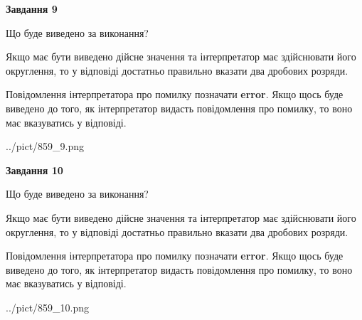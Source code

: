 \documentclass[12pt, ukrainian]{article}
\begin{document}
{\begin {Large}
{\begin {center}\textbf{Завдання 9}\end {center}}\par
Що буде виведено за виконання? \par

Якщо має бути виведено дійсне значення та інтерпретатор має здійснювати його округлення, 
то у відповіді достатньо правильно вказати два дробових розряди.

Повідомлення інтерпретатора про помилку позначати \textbf{error}.
Якщо щось буде виведено до того, як інтерпретатор видасть повідомлення про помилку, 
то воно має вказуватись у відповіді. \par

\begin{center}
	{../pict/859_9.png}
\end{center}
\newpage

{\begin {center}\textbf{Завдання 10}\end {center}}\par
Що буде виведено за виконання? \par

Якщо має бути виведено дійсне значення та інтерпретатор має здійснювати його округлення, 
то у відповіді достатньо правильно вказати два дробових розряди.

Повідомлення інтерпретатора про помилку позначати \textbf{error}.
Якщо щось буде виведено до того, як інтерпретатор видасть повідомлення про помилку, 
то воно має вказуватись у відповіді. \par

\begin{center}
	{../pict/859_10.png}
\end{center}
\newpage

\end {Large}}
\end{document}
